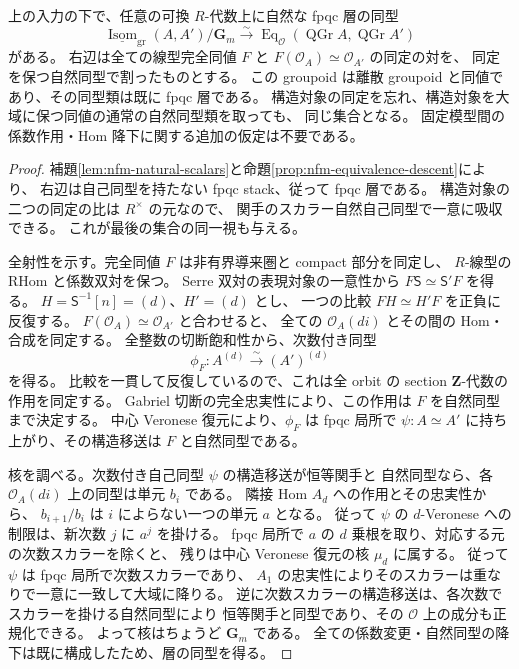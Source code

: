 \begin{theorem}
\label{thm:nfm-fixed-model-comparison}
上の入力の下で、任意の可換 $R$-代数上に自然な fpqc 層の同型
\[
 \underline{\operatorname{Isom}}_{\mathrm{gr}}(A,A')/\mathbf G_m
 \xrightarrow{\sim}
 \operatorname{Eq}_{\mathcal O}( \operatorname{QGr}A,\operatorname{QGr}A')
\]
がある。
右辺は全ての線型完全同値 $F$ と
$F(\mathcal O_A)\simeq\mathcal O_{A'}$ の同定の対を、
同定を保つ自然同型で割ったものとする。
この groupoid は離散 groupoid と同値であり、その同型類は既に fpqc 層である。
構造対象の同定を忘れ、構造対象を大域に保つ同値の通常の自然同型類を取っても、
同じ集合となる。
固定模型間の係数作用・Hom 降下に関する追加の仮定は不要である。
\end{theorem}

\begin{proof}
補題\ref{lem:nfm-natural-scalars}と命題\ref{prop:nfm-equivalence-descent}により、
右辺は自己同型を持たない fpqc stack、従って fpqc 層である。
構造対象の二つの同定の比は $R^\times$ の元なので、
関手のスカラー自然自己同型で一意に吸収できる。
これが最後の集合の同一視も与える。

全射性を示す。完全同値 $F$ は非有界導来圏と compact 部分を同定し、
$R$-線型の RHom と係数双対を保つ。
Serre 双対の表現対象の一意性から
$F\mathsf S\simeq\mathsf S'F$ を得る。
$H=\mathsf S^{-1}[n]=(d)$、$H'=(d)$ とし、
一つの比較 $FH\simeq H'F$ を正負に反復する。
$F(\mathcal O_A)\simeq\mathcal O_{A'}$ と合わせると、
全ての $\mathcal O_A(di)$ とその間の Hom・合成を同定する。
全整数の切断飽和性から、次数付き同型
\[
 \phi_F:A^{(d)}\xrightarrow{\sim}(A')^{(d)}
\]
を得る。
比較を一貫して反復しているので、これは全 orbit の
section $\mathbf Z$-代数の作用を同定する。
Gabriel 切断の完全忠実性により、この作用は $F$ を自然同型まで決定する。
中心 Veronese 復元により、$\phi_F$ は fpqc 局所で
$\psi:A\simeq A'$ に持ち上がり、その構造移送は $F$ と自然同型である。

核を調べる。次数付き自己同型 $\psi$ の構造移送が恒等関手と
自然同型なら、各 $\mathcal O_A(di)$ 上の同型は単元 $b_i$ である。
隣接 Hom $A_d$ への作用とその忠実性から、
$b_{i+1}/b_i$ は $i$ によらない一つの単元 $a$ となる。
従って $\psi$ の $d$-Veronese への制限は、新次数 $j$ に $a^j$ を掛ける。
fpqc 局所で $a$ の $d$ 乗根を取り、対応する元の次数スカラーを除くと、
残りは中心 Veronese 復元の核 $\mu_d$ に属する。
従って $\psi$ は fpqc 局所で次数スカラーであり、
$A_1$ の忠実性によりそのスカラーは重なりで一意に一致して大域に降りる。
逆に次数スカラーの構造移送は、各次数でスカラーを掛ける自然同型により
恒等関手と同型であり、その $\mathcal O$ 上の成分も正規化できる。
よって核はちょうど $\mathbf G_m$ である。
全ての係数変更・自然同型の降下は既に構成したため、層の同型を得る。
\end{proof}

